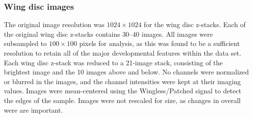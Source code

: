 \documentclass[10pt,twocolumn]{article}
\newcommand{\fig}[0]{Fig.}
\begin{document}
\subsubsection*{Wing disc images}

The original image resolution was $1024 \times 1024$ for the wing disc z-stacks.
%
Each of the original wing disc z-stacks contains 30--40 images. 
%
All images were subsampled to $100 \times 100$ pixels for analysis, as this was found to be a sufficient resolution to retain all of the major developmental features within the data set. 
%
Each wing disc z-stack was reduced to a 21-image stack, consisting of the brightest image and the 10 images above and below.
%
No channels were normalized or blurred in the images, and the channel intensities were kept at their imaging values. 
%
Images were mean-centered using the Wingless/Patched signal to detect the edges of the sample. 
%
Images were not rescaled for size, as changes in overall were are important. 


\end{document}
